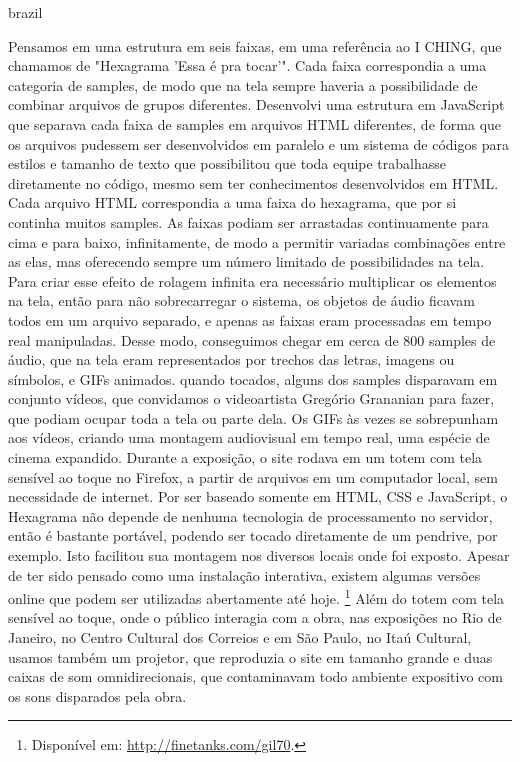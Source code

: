 \begin{otherlanguage*}{brazil}
\begin{description}
\end{description}


Pensamos em uma estrutura em seis faixas, em uma referência ao I CHING, que chamamos de "Hexagrama 'Essa é pra tocar'".  Cada faixa correspondia a uma categoria de samples, de modo que na tela sempre haveria a possibilidade de combinar arquivos de grupos diferentes. Desenvolvi uma estrutura em JavaScript que separava cada faixa de samples em arquivos HTML diferentes, de forma que os arquivos pudessem ser desenvolvidos em paralelo e um sistema de códigos para estilos e tamanho de texto que possibilitou que toda equipe trabalhasse diretamente no código, mesmo sem ter conhecimentos desenvolvidos em HTML. 
Cada arquivo HTML correspondia a uma faixa do hexagrama, que por si continha muitos samples. As faixas podiam ser arrastadas continuamente para cima e para baixo, infinitamente, de modo a permitir variadas combinações entre as elas, mas oferecendo sempre um número limitado de possibilidades na tela. Para criar esse efeito de rolagem infinita era necessário multiplicar os elementos na tela, então para não sobrecarregar o sistema, os objetos de áudio ficavam todos em um arquivo separado, e apenas as faixas eram processadas em tempo real manipuladas. 
Desse modo, conseguimos chegar em cerca de 800 samples de áudio, que na tela eram representados por trechos das letras, imagens ou símbolos, e GIFs animados. quando tocados, alguns dos samples disparavam em conjunto vídeos, que convidamos o videoartista Gregório Grananian para fazer, que podiam ocupar toda a tela ou parte dela. Os GIFs às vezes se sobrepunham aos vídeos,  criando uma montagem audiovisual em tempo real, uma espécie de cinema expandido. 
Durante a exposição, o site rodava em um totem com tela sensível ao toque no Firefox, a partir de arquivos em um computador local, sem necessidade de internet. Por ser baseado somente em HTML, CSS e JavaScript, o Hexagrama não depende de nenhuma tecnologia de processamento no servidor, então é bastante portável, podendo ser tocado diretamente de um pendrive, por exemplo. Isto facilitou sua montagem nos diversos locais onde foi exposto. Apesar de ter sido pensado como uma instalação interativa, existem algumas versões online que podem ser utilizadas abertamente até hoje. \footnote{Disponível em: \url{http://finetanks.com/gil70}.}
Além do totem com tela sensível ao toque, onde o público interagia com a obra, nas exposições no Rio de Janeiro, no Centro Cultural dos Correios e em São Paulo, no Itaú Cultural, usamos também um projetor, que reproduzia o site em tamanho grande e duas caixas de som omnidirecionais, que contaminavam todo ambiente expositivo com os sons disparados pela obra.


\end{otherlanguage*}
